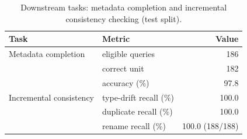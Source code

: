 \begin{table}[t]
\caption{Downstream tasks: metadata completion and incremental consistency checking (test split).}
\label{tab:downstream}
\centering
\footnotesize
\setlength{\tabcolsep}{3.5pt}
\begin{tabular}{llr}
\toprule
Task & Metric & Value \\
\midrule
Metadata completion & eligible queries & 186 \\
 & correct unit & 182 \\
 & accuracy (\%) & 97.8 \\
\midrule
Incremental consistency & type-drift recall (\%) & 100.0 \\
 & duplicate recall (\%) & 100.0 \\
 & rename recall (\%) & 100.0 (188/188) \\
\bottomrule
\end{tabular}
\end{table}

